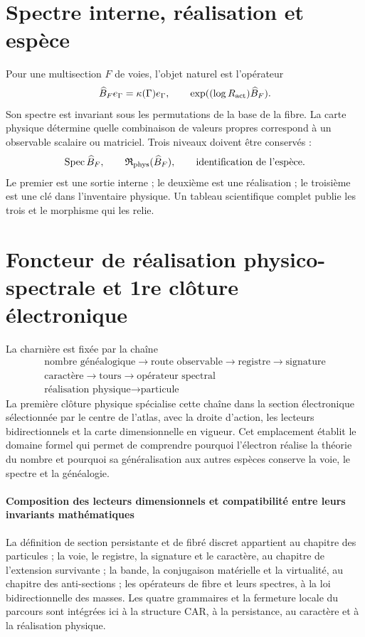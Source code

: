 \section{Spectre interne, réalisation et espèce}

Pour une multisection \(F\) de voies, l'objet naturel est l'opérateur
\[
 \widehat B_F e_\Gamma
 =\kappa(\Gamma)e_\Gamma,
 \qquad
 \exp((\log R_{\rm act})\widehat B_F).
\]
Son spectre est invariant sous les permutations de la base de la fibre. La carte
physique détermine quelle combinaison de valeurs propres correspond à un observable
scalaire ou matriciel. Trois niveaux doivent être conservés :
\[
 \operatorname{Spec}\widehat B_F,
 \qquad
 \mathfrak R_{\rm phys}(\widehat B_F),
 \qquad
 \text{identification de l'espèce}.
\]
Le premier est une sortie interne ; le deuxième est une réalisation ; le troisième
est une clé dans l'inventaire physique. Un tableau scientifique complet
publie les trois et le morphisme qui les relie.

\section{Foncteur de réalisation physico-spectrale et 1re clôture électronique}

La charnière est fixée par la chaîne
\[
 \boxed{\begin{gathered}
 \text{nombre généalogique}
 \longrightarrow\text{route observable}
 \longrightarrow\text{registre}
 \longrightarrow\text{signature}
 \\
 \text{caractère}
 \longrightarrow\text{tours}
 \longrightarrow\text{opérateur spectral}
 \\
 \text{réalisation physique}
 \longrightarrow\text{particule}
 \end{gathered}}
\]
La première clôture physique spécialise cette chaîne dans la section électronique
sélectionnée par le centre de l'atlas, avec la droite d'action, les lecteurs
bidirectionnels et la carte dimensionnelle en vigueur. Cet emplacement établit le
domaine formel qui permet de comprendre pourquoi l'électron réalise la théorie
du nombre et pourquoi sa généralisation aux autres espèces conserve la voie,
le spectre et la généalogie.

\paragraph{Composition des lecteurs dimensionnels et compatibilité entre leurs invariants mathématiques}
La définition de section persistante et de fibré discret appartient au chapitre
des particules ; la voie, le registre, la signature et le caractère, au chapitre de
l'extension survivante ; la bande, la conjugaison matérielle et la virtualité,
au chapitre des anti-sections ; les opérateurs de fibre et leurs spectres, à la
loi bidirectionnelle des masses. Les quatre grammaires et la fermeture locale du
parcours sont intégrées ici à la structure CAR, à la persistance, au caractère
et à la réalisation physique.
